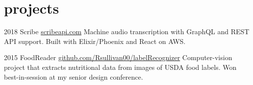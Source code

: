 \documentclass[]{friggeri-cv} %
\begin{document}
\begin{entrylist}
%


\end{entrylist}


\section{projects}

\begin{entrylist}

\entry
{2018}
{Scribe}
{\href{https://scribeapi.com}{scribeapi.com}}
{Machine audio transcription with GraphQL and REST API support. Built with Elixir/Phoenix and React on AWS.}

\entry
{2015}
{FoodReader}
{\href{https://github.com/Rsullivan00/labelRecognizer}{github.com/Rsullivan00/labelRecognizer}}
{Computer-vision project that extracts nutritional data from images of USDA food labels. Won best-in-session at my senior design conference.}



\end{entrylist}
\end{document}
